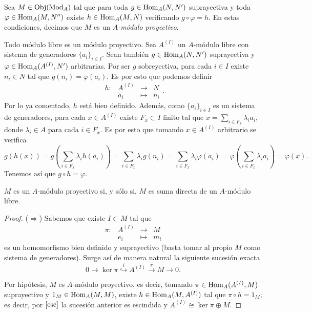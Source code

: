 \documentclass[../main.tex]{subfiles}
\begin{document}
\begin{definition}
	Sea $M\in\operatorname{Obj}(\operatorname{Mod}_A)$ tal que para toda $g\in\operatorname{Hom}_A(N,N')$ suprayectiva y toda $\varphi\in\operatorname{Hom}_A(M,N'')$ existe $h\in\operatorname{Hom}_A(M,N)$ verificando $g\circ\varphi=h$. En estas condiciones, decimos que $M$ es un \textit{$A$-módulo proyectivo}.
\end{definition}
\begin{remark}
	Todo módulo libre es un módulo proyectivo. Sea $A^{(I)}$ un $A$-módulo libre con sistema de generadores $\{a_i\}_{i\in I}$. Sean también $g\in\operatorname{Hom}_A(N,N')$ suprayectiva y $\varphi\in\operatorname{Hom}_A(A^{(I)},N')$ arbitrarias. Por ser $g$ sobreyectiva, para cada $i\in I$ existe $n_i\in N$ tal que $g(n_i)=\varphi(a_i)$. Es por esto que podemos definir
	$$
	\begin{array}{rrcl}
	h:&A^{(I)}&\longrightarrow&N\\
	&a_i&\longmapsto&n_i
	\end{array}.$$
	Por lo ya comentado, $h$ está bien definido. Además, como $\{a_i\}_{i\in I}$ es un sistema de generadores, para cada $x\in A^{(I)}$ existe $F_x\subset I$ finito tal que $x=\sum_{i\in F_x}\lambda_i a_i$, donde $\lambda_i\in A$ para cada $i\in F_x$.
	Es por esto que tomando $x\in A^{(I)}$ arbitrario se verifica
	$$g(h(x))=g\left(\sum_{i\in F_x}\lambda_i h(a_i)\right)=\sum_{i\in F_x}\lambda_i g(n_i)=\sum_{i\in F_x}\lambda_i \varphi(a_i)=\varphi\left(\sum_{i\in F_x}\lambda_i a_i\right)=\varphi(x).$$
	Tenemos así que $g\circ h=\varphi$.
\end{remark}

\begin{proposition}
	$M$ es un $A$-módulo proyectivo si, y sólo si, $M$ es suma directa de un $A$-módulo libre.
\end{proposition}
\begin{proof}
	($\Rightarrow$) Sabemos que existe $I\subset M$ tal que
	$$\begin{array}{rrcl}
	\pi:&A^{(I)}&\longrightarrow&M  \\
	&e_i&\longmapsto&m_i
	\end{array}$$
	es un homomorfismo bien definido y suprayectivo (basta tomar al propio $M$ como sistema de generadores). Surge así de manera natural la siguiente sucesión exacta
	$$0\rightarrow\ker{\pi}\overset{i}{\hookrightarrow}A^{(I)}\overset{\pi}{\rightarrow}M\rightarrow0.$$

	Por hipótesis, $M$ es $A$-módulo proyectivo, es decir, tomando $\pi\in\operatorname{Hom}_A(A^{(I)},M)$ suprayectivo y $1_M\in\operatorname{Hom}_A(M,M)$, existe $h\in\operatorname{Hom}_A(M,A^{(I)})$ tal que $\pi\circ h=1_M$; es decir, por $\ref{esc}$ la sucesión anterior es escindida y $A^{(I)}\cong \ker\pi\oplus M$.
\end{proof}
\end{document}
